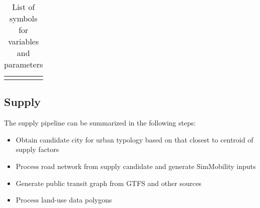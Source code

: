 \documentclass[11pt,twoside]{article}
\numberwithin{equation}{section}
\newcommand{\?}{\stackrel{?}{=}}
\begin{document}
\begin{table}[h!]
  \centering
  \begin{tabular}{l l l}
    &&
  \end{tabular}
  \caption{List of symbols for variables and parameters}
  \label{tab:symbols}
\end{table}






\subsection{Supply}
The supply pipeline can be summarized in the following steps:
\begin{itemize}
\item Obtain candidate city for urban typology based on that closest to centroid of supply factors
\item Process road network from supply candidate and generate SimMobility inputs
\item Generate public transit graph from GTFS and other sources
\item Process land-use data polygons
\end{itemize}
\end{document}
